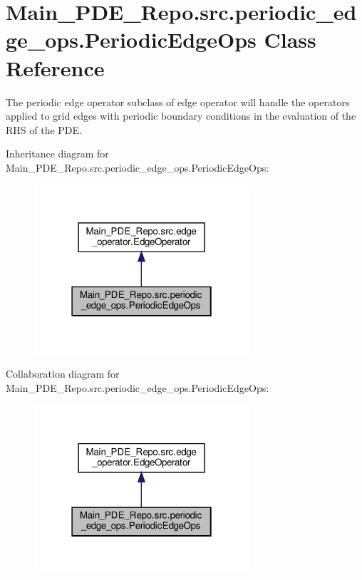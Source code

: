 \hypertarget{classMain__PDE__Repo_1_1src_1_1periodic__edge__ops_1_1PeriodicEdgeOps}{}\section{Main\+\_\+\+P\+D\+E\+\_\+\+Repo.\+src.\+periodic\+\_\+edge\+\_\+ops.\+Periodic\+Edge\+Ops Class Reference}
\label{classMain__PDE__Repo_1_1src_1_1periodic__edge__ops_1_1PeriodicEdgeOps}


The periodic edge operator subclass of edge operator will handle the operators applied to grid edges with periodic boundary conditions in the evaluation of the R\+HS of the P\+DE.  




Inheritance diagram for Main\+\_\+\+P\+D\+E\+\_\+\+Repo.\+src.\+periodic\+\_\+edge\+\_\+ops.\+Periodic\+Edge\+Ops\+:
\nopagebreak
\begin{figure}[H]
\begin{center}
\leavevmode
\includegraphics[width=226pt]{classMain__PDE__Repo_1_1src_1_1periodic__edge__ops_1_1PeriodicEdgeOps__inherit__graph}
\end{center}
\end{figure}


Collaboration diagram for Main\+\_\+\+P\+D\+E\+\_\+\+Repo.\+src.\+periodic\+\_\+edge\+\_\+ops.\+Periodic\+Edge\+Ops\+:
\nopagebreak
\begin{figure}[H]
\begin{center}
\leavevmode
\includegraphics[width=226pt]{classMain__PDE__Repo_1_1src_1_1periodic__edge__ops_1_1PeriodicEdgeOps__coll__graph}
\end{center}
\end{figure}
